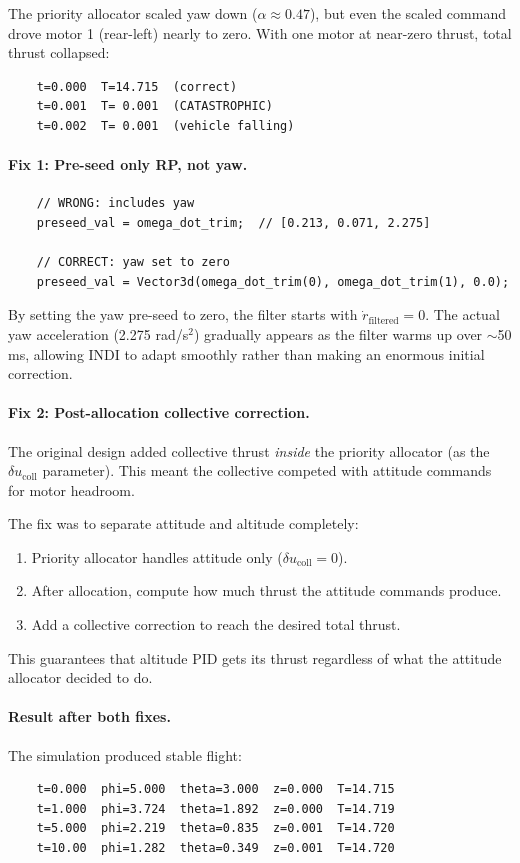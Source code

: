 \documentclass[12pt, a4paper]{article}
\begin{document}
The priority allocator scaled yaw down ($\alpha \approx 0.47$), but even the scaled command drove motor 1 (rear-left) nearly to zero.  With one motor at near-zero thrust, total thrust collapsed:
\begin{verbatim}
    t=0.000  T=14.715  (correct)
    t=0.001  T= 0.001  (CATASTROPHIC)
    t=0.002  T= 0.001  (vehicle falling)
\end{verbatim}

\paragraph{Fix 1: Pre-seed only RP, not yaw.}
\begin{verbatim}
    // WRONG: includes yaw
    preseed_val = omega_dot_trim;  // [0.213, 0.071, 2.275]

    // CORRECT: yaw set to zero
    preseed_val = Vector3d(omega_dot_trim(0), omega_dot_trim(1), 0.0);
\end{verbatim}

By setting the yaw pre-seed to zero, the filter starts with $\dot{r}_{\text{filtered}} = 0$.  The actual yaw acceleration (2.275 rad/s$^2$) gradually appears as the filter warms up over $\sim$50 ms, allowing INDI to adapt smoothly rather than making an enormous initial correction.

\paragraph{Fix 2: Post-allocation collective correction.}  The original design added collective thrust \emph{inside} the priority allocator (as the $\delta u_{\text{coll}}$ parameter).  This meant the collective competed with attitude commands for motor headroom.

The fix was to separate attitude and altitude completely:
\begin{enumerate}
    \item Priority allocator handles attitude only ($\delta u_{\text{coll}} = 0$).
    \item After allocation, compute how much thrust the attitude commands produce.
    \item Add a collective correction to reach the desired total thrust.
\end{enumerate}

This guarantees that altitude PID gets its thrust regardless of what the attitude allocator decided to do.

\paragraph{Result after both fixes.}  The simulation produced stable flight:
\begin{verbatim}
    t=0.000  phi=5.000  theta=3.000  z=0.000  T=14.715
    t=1.000  phi=3.724  theta=1.892  z=0.000  T=14.719
    t=5.000  phi=2.219  theta=0.835  z=0.001  T=14.720
    t=10.00  phi=1.282  theta=0.349  z=0.001  T=14.720
\end{verbatim}
\end{document}
